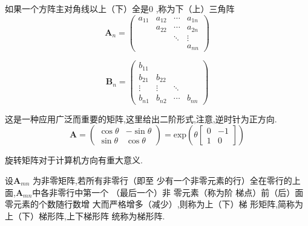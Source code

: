 \begin{formal}
\begin{definition}[三角矩阵]

如果一个方阵主对角线以上（下）全是$\displaystyle 0$
,称为下（上）三角阵
\[
    \bm{A}_n = \begin{pmatrix}
        a_{11} & a_{12} &\cdots & a_{1n} \\
        & a_{22} & \cdots & a_{2n}\\
        & & \ddots & \vdots \\
        & & & a_{nn}
    \end{pmatrix} 
\]

\[
    \displaystyle
    \bm{B}_n = \begin{pmatrix}
        b_{11} & & & \\
        b_{21} & b_{22} & & \\
        \vdots & \vdots & \ddots & \\
        b_{n1} & b_{n2} & \cdots & b_{nn}
    \end{pmatrix}
\]
\end{definition}
\end{formal}
\begin{formal}
\begin{definition}[旋转矩阵]\label{def:旋转矩阵}
这是一种应用广泛而重要的矩阵,这里给出二阶形式,注意,逆时针为正方向.
\[
\bm{A} = \begin{pmatrix}
    \cos \theta  & -\sin\theta \\
    \sin\theta & \cos\theta 
\end{pmatrix}
= \mathrm{exp}\left(
    \theta \begin{bmatrix}
        0 & -1 \\
        1 & 0
    \end{bmatrix}
\right)
\]\end{definition}\end{formal}
\begin{red}
    \begin{remark}
        旋转矩阵对于计算机方向有重大意义.
    \end{remark}
\end{red}
\vfill
\begin{formal}
\begin{definition}[阶梯形矩阵]\label{def:阶梯形矩阵}
设$\bm{A}_{mn}$
为非零矩阵,若所有非零行（即至
少有一个非零元素的行）全在零行的上
面,$\bm{A}_{mn}$中各非零行中第一个
（最后一个）非
零元素（称为阶
梯点）前（后）面零元素的个数随行数增
大而严格增多（减少）,则称为上（下）梯
形矩阵,简称为上（下）梯形阵,上下梯形阵
统称为梯形阵.
\end{definition}
\end{formal}

